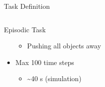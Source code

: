 \begin{frame}{Task Definition}{}
\begin{columns}
\begin{column}{0.35\textwidth}
\begin{block}{Episodic Task}
\begin{itemize}
\begin{itemize}
                              \item Pushing all objects away
                          \end{itemize}
                    \item Max 100 time steps
                          \begin{itemize}
                              \item \textasciitilde 40 s (simulation)
                          \end{itemize}
                \end{itemize}
            \end{block}
        \end{column}
    \end{columns}
\end{frame}

